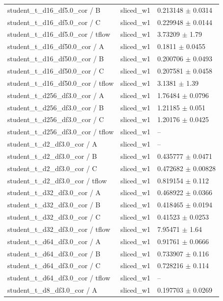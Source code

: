 \begin{tabular}{lll}
student\_t\_d16\_df5.0\_cor / B & sliced\_w1 & 0.213148 $\pm$ 0.0314 \\
student\_t\_d16\_df5.0\_cor / C & sliced\_w1 & 0.229948 $\pm$ 0.0144 \\
student\_t\_d16\_df5.0\_cor / tflow & sliced\_w1 & 3.73209 $\pm$ 1.79 \\
student\_t\_d16\_df50.0\_cor / A & sliced\_w1 & 0.1811 $\pm$ 0.0455 \\
student\_t\_d16\_df50.0\_cor / B & sliced\_w1 & 0.200706 $\pm$ 0.0493 \\
student\_t\_d16\_df50.0\_cor / C & sliced\_w1 & 0.207581 $\pm$ 0.0458 \\
student\_t\_d16\_df50.0\_cor / tflow & sliced\_w1 & 3.1381 $\pm$ 1.39 \\
student\_t\_d256\_df3.0\_cor / A & sliced\_w1 & 1.76484 $\pm$ 0.0796 \\
student\_t\_d256\_df3.0\_cor / B & sliced\_w1 & 1.21185 $\pm$ 0.051 \\
student\_t\_d256\_df3.0\_cor / C & sliced\_w1 & 1.20176 $\pm$ 0.0425 \\
student\_t\_d256\_df3.0\_cor / tflow & sliced\_w1 & -- \\
student\_t\_d2\_df3.0\_cor / A & sliced\_w1 & -- \\
student\_t\_d2\_df3.0\_cor / B & sliced\_w1 & 0.435777 $\pm$ 0.0471 \\
student\_t\_d2\_df3.0\_cor / C & sliced\_w1 & 0.472682 $\pm$ 0.00828 \\
student\_t\_d2\_df3.0\_cor / tflow & sliced\_w1 & 0.819154 $\pm$ 0.112 \\
student\_t\_d32\_df3.0\_cor / A & sliced\_w1 & 0.468922 $\pm$ 0.0366 \\
student\_t\_d32\_df3.0\_cor / B & sliced\_w1 & 0.418465 $\pm$ 0.0194 \\
student\_t\_d32\_df3.0\_cor / C & sliced\_w1 & 0.41523 $\pm$ 0.0253 \\
student\_t\_d32\_df3.0\_cor / tflow & sliced\_w1 & 7.95471 $\pm$ 1.64 \\
student\_t\_d64\_df3.0\_cor / A & sliced\_w1 & 0.91761 $\pm$ 0.0666 \\
student\_t\_d64\_df3.0\_cor / B & sliced\_w1 & 0.733907 $\pm$ 0.116 \\
student\_t\_d64\_df3.0\_cor / C & sliced\_w1 & 0.728216 $\pm$ 0.114 \\
student\_t\_d64\_df3.0\_cor / tflow & sliced\_w1 & -- \\
student\_t\_d8\_df3.0\_cor / A & sliced\_w1 & 0.197703 $\pm$ 0.0269 \\

\end{tabular}
